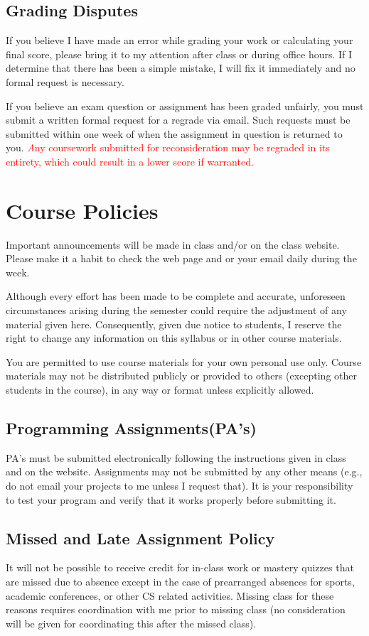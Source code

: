 \documentclass[11pt]{article}
\begin{document}
\subsection{Grading Disputes}
If you believe I have made an error while grading your work or calculating your final score, please 
bring it to my attention after class or during office hours. If I determine that there has been a simple mistake,
I will fix it immediately and no formal request is necessary. 

If you believe an exam question or assignment has been graded unfairly, you 
must submit a written formal request for a regrade via email.
Such requests 
must be submitted within one week of when the assignment in question is returned to you. 
\textcolor{red}{\emph Any coursework submitted for reconsideration may be regraded in its entirety, which could result 
in a lower score if warranted.}

\section{Course Policies}
Important announcements will be made in class and/or on the class website. Please make it a habit to check the web page and or your email daily during the week. 

Although every effort has been made to be complete and accurate, unforeseen circumstances arising during the semester could require the adjustment of any material given here. Consequently, given due notice to students, I reserve the right to change any information on this syllabus or in other course materials.

You are permitted to use course materials for your own personal use only. Course materials may not be distributed publicly or provided to others (excepting other students in the course), in any way or format unless explicitly allowed. 


\subsection{Programming Assignments(PA's)}
PA's must be submitted electronically following the instructions given in class and on the website.
Assignments may not be submitted by any 
other means (e.g., do not email your projects to me unless I request that). It is your responsibility to test your 
program and verify that it works properly before submitting it.

\subsection{Missed and Late Assignment Policy}
It will not be possible to receive credit for in-class work or mastery quizzes that are 
missed due to absence except in the case of
prearranged absences for sports, academic conferences, or other CS related activities.  Missing class
for these reasons requires coordination with me prior to missing class (no consideration will be given for
coordinating this after the missed class).
\end{document}
